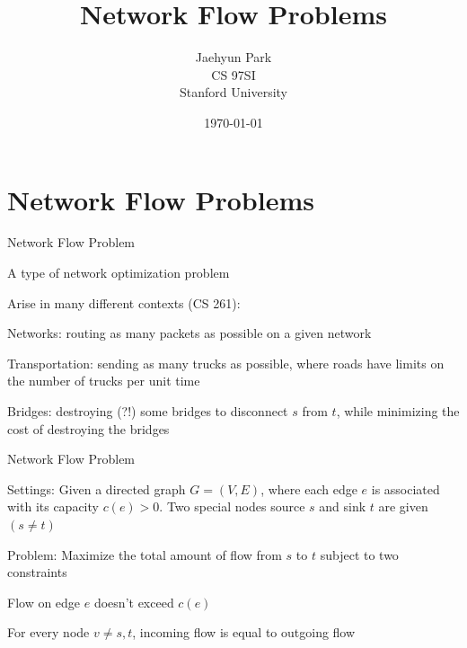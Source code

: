 \documentclass[13pt,onlymath]{beamer}
\title{\large \bfseries Network Flow Problems}
\author{Jaehyun Park\\[3ex]
CS 97SI\\
Stanford University}
\date{\today}
\begin{document}
\frame{
\thispagestyle{empty}
\titlepage
}

\section{Network Flow Problems}

\begin{frame}{Network Flow Problem}
\BIT
\item A type of network optimization problem
\item Arise in many different contexts (CS 261):
\BIT
\item Networks: routing as many packets as possible on a given network
\item Transportation: sending as many trucks as possible, where roads have limits on the number of trucks per unit time
\item Bridges: destroying (?!) some bridges to disconnect $s$ from $t$, while minimizing the cost of destroying the bridges
\EIT \EIT
\end{frame}

\begin{frame}{Network Flow Problem}
\BIT
\item Settings: Given a directed graph $G = (V, E)$, where each edge $e$ is associated with its capacity $c(e) > 0$. Two special nodes source $s$ and sink $t$ are given $(s \ne t)$
\vfill
\item Problem: Maximize the total amount of flow from $s$ to $t$ subject to two constraints
\BIT
\item Flow on edge $e$ doesn't exceed $c(e)$
\item For every node $v\ne s, t$, incoming flow is equal to outgoing flow
\EIT \EIT
\end{frame}
\end{document}
